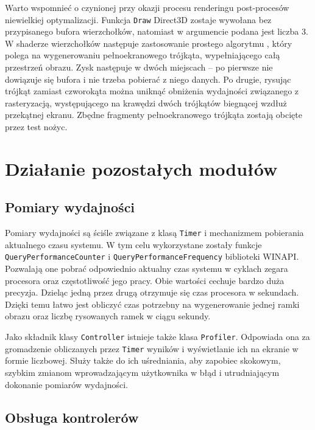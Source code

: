 		Warto wspomnieć o czynionej przy okazji procesu renderingu post-procesów niewielkiej optymalizacji. Funkcja \texttt{Draw} Direct3D zostaje wywołana bez przypisanego bufora wierzchołków, natomiast w argumencie podana jest liczba 3. W shaderze wierzchołków następuje zastosowanie prostego algorytmu \cite{build01}, który polega na wygenerowaniu pełnoekranowego trójkąta, wypełniającego całą przestrzeń obrazu. Zysk następuje w dwóch miejscach -- po pierwsze nie dowiązuje się bufora i nie trzeba pobierać z niego danych. Po drugie, rysując trójkąt zamiast czworokąta można uniknąć obniżenia wydajności związanego z rasteryzacją, występującego na krawędzi dwóch trójkątów biegnącej wzdłuż przekątnej ekranu. Zbędne fragmenty pełnoekranowego trójkąta zostają obcięte przez test nożyc.
	
	\section{Działanie pozostałych modułów}
	\label{t:budowa:inne}
	
		\subsection{Pomiary wydajności}
		\label{t:budowa:inne:profiling}
		
		
		Pomiary wydajności są ściśle związane z klasą \texttt{Timer} i mechanizmem pobierania aktualnego czasu systemu. W tym celu wykorzystane zostały funkcje \texttt{QueryPerformanceCounter} i \texttt{QueryPerformanceFrequency} biblioteki WINAPI. Pozwalają one pobrać odpowiednio aktualny czas systemu w cyklach zegara procesora oraz częstotliwość jego pracy. Obie wartości cechuje bardzo duża precyzja. Dzieląc jedną przez drugą otrzymuje się czas procesora w sekundach. Dzięki temu łatwo jest obliczyć czas potrzebny na wygenerowanie jednej ramki obrazu oraz liczbę rysowanych ramek w ciągu sekundy.
		
		Jako składnik klasy \texttt{Controller} istnieje także klasa \texttt{Profiler}. Odpowiada ona za gromadzenie obliczanych przez \texttt{Timer} wyników i wyświetlanie ich na ekranie w formie liczbowej. Służy także do ich uśredniania, aby zapobiec skokowym, szybkim zmianom wprowadzającym użytkownika w błąd i utrudniającym dokonanie pomiarów wydajności.
	
		\subsection{Obsługa kontrolerów}
		\label{t:budowa:inne:input}
		
